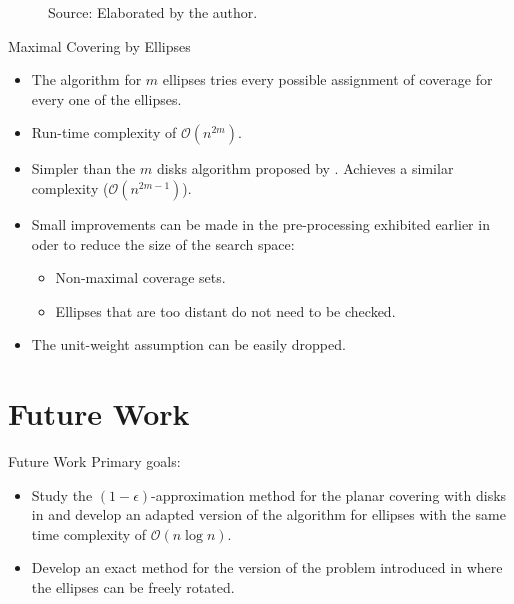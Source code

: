 \documentclass{beamer}
\newcommand{\bigO}{\mathscr{O}}
\newcommand{\source}[1]{\caption*{Source: {#1}} }
\begin{document}
\begin{frame}
	\begin{figure}
		\caption{Optimal solution with two ellipses for a random instance.}
		
		\source{Elaborated by the author.}
	\end{figure}
\end{frame}

\begin{frame}{Maximal Covering by Ellipses}
	
	\begin{itemize}
		\item The algorithm for $m$ ellipses tries every possible assignment of coverage for every one of the ellipses.
		\item Run-time complexity of $\bigO(n^{2m})$.
		
		\item Simpler than the $m$ disks algorithm proposed by \autocite{cabello:2006}. Achieves a similar complexity ($\bigO(n^{2m-1})$).
		
		\item Small improvements can be made in the pre-processing exhibited earlier in oder to reduce the size of the search space:
		\begin{itemize}
			\item Non-maximal coverage sets.
			\item Ellipses that are too distant do not need to be checked.
		\end{itemize}
	
		\item The unit-weight assumption can be easily dropped.
	\end{itemize}
	
\end{frame}




\section{Future Work}

\begin{frame}{Future Work}
	Primary goals:
\begin{itemize}
	\item Study the $(1-\epsilon)$-approximation method for the planar covering with disks in \autocite{cabello:2006} and develop an adapted version of the algorithm for ellipses with the same time complexity of $\bigO(n\log{n})$.
	
	\item Develop an exact method for the version of the problem introduced in \autocite{andreta} where the ellipses can be freely rotated.
\end{itemize}
\end{frame}
\end{document}
